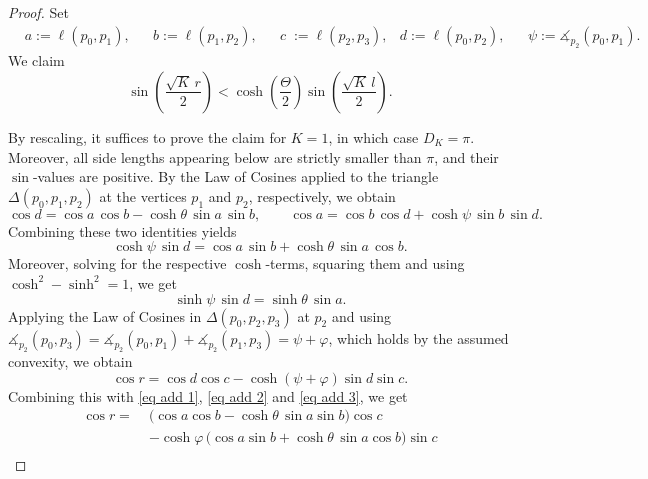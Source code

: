 \documentclass[hidelinks,12pt,a4paper]{article}
\numberwithin{equation}{section}
\theoremstyle{plain}
\theoremstyle{definition}
\DeclareMathOperator{\arcosh}{arcosh}
\newcommand{\ma}{\ensuremath{\measuredangle}}
\begin{document}
\begin{proof}
Set
\begin{equation*}
\begin{aligned}
&a:=\ell(p_0,p_1), &&b:=\ell(p_1,p_2), &&c\;:=\ell(p_2,p_3), 
&d:=\ell(p_0,p_2), &&\psi:=\ma_{p_2}(p_0,p_1).
\end{aligned}
\end{equation*}
We claim
\begin{equation*}
\sin\left(\frac{\sqrt K\,r}{2}\right)
< \cosh\left(\frac{\Theta}{2}\right)
\sin\left(\frac{\sqrt K\,l}{2}\right).
\end{equation*}

By rescaling, it suffices to prove the claim for $K=1$, in which case $D_K=\pi$.  
Moreover, all side lengths appearing below are strictly smaller than $\pi$, and their $\sin$-values are positive.
By the Law of Cosines applied to the triangle $\Delta(p_0,p_1,p_2)$ at the vertices $p_1$ and $p_2$, respectively, we obtain 
\begin{equation}\label{eq add 1}
\cos d =
\cos a\,\cos b-\cosh\theta\,\sin a\, \sin b,\qquad \cos a =
\cos b\,\cos d+\cosh\psi\,\sin b\, \sin d.
\end{equation}
Combining these two identities yields
\begin{equation}\label{eq add 2}
\cosh\psi\,\sin d
=
\cos a\,\sin b+\cosh\theta\,\sin a\,\cos b.
\end{equation}
Moreover, solving for the respective $\cosh$-terms, squaring them and using $\cosh^2-\sinh^2=1$, we get
\begin{equation}\label{eq add 3}
\sinh\psi\,\sin d
=
\sinh\theta\,\sin a.
\end{equation}
Applying the Law of Cosines in $\Delta(p_0,p_2,p_3)$ at $p_2$ and using $\ma_{p_2}(p_0,p_3) = \ma_{p_2}(p_0,p_1) + \ma_{p_2}(p_1,p_3) = \psi + \varphi$, which holds by the assumed convexity, we obtain
\begin{equation*}
\cos r
=
\cos d\cos c-\cosh(\psi+\varphi)\sin d\sin c.    
\end{equation*}
Combining this with \eqref{eq add 1}, \eqref{eq add 2} and \eqref{eq add 3}, we get
\begin{equation*}
\begin{aligned}
\cos r
=\;&
\bigl(\cos a\cos b-\cosh\theta\,\sin a\sin b\bigr)\cos c\\
&-\cosh\varphi\,
\bigl(\cos a\sin b+\cosh\theta\,\sin a\cos b\bigr)\sin c\\

\end{aligned}
\end{equation*}
\end{proof}
\end{document}
